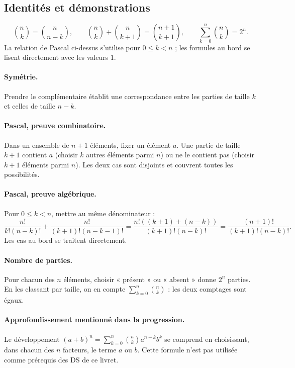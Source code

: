 \subsection{Identités et démonstrations}
\[\binom nk=\binom n{n-k},\qquad \binom nk+\binom n{k+1}=\binom{n+1}{k+1},\qquad\sum_{k=0}^n\binom nk=2^n.\]
La relation de Pascal ci-dessus s'utilise pour $0\le k<n$ ; les formules au bord se lisent directement avec les valeurs $1$.
\paragraph{Symétrie.} Prendre le complémentaire établit une correspondance entre les parties de taille $k$ et celles de taille $n-k$.
\paragraph{Pascal, preuve combinatoire.} Dans un ensemble de $n+1$ éléments, fixer un élément $a$. Une partie de taille $k+1$ contient $a$ (choisir $k$ autres éléments parmi $n$) ou ne le contient pas (choisir $k+1$ éléments parmi $n$). Les deux cas sont disjoints et couvrent toutes les possibilités.
\paragraph{Pascal, preuve algébrique.} Pour $0\le k<n$, mettre au même dénominateur :
\[\frac{n!}{k!(n-k)!}+\frac{n!}{(k+1)!(n-k-1)!}
=\frac{n!((k+1)+(n-k))}{(k+1)!(n-k)!}
=\frac{(n+1)!}{(k+1)!(n-k)!}.\]
Les cas au bord se traitent directement.
\paragraph{Nombre de parties.} Pour chacun des $n$ éléments, choisir « présent » ou « absent » donne $2^n$ parties. En les classant par taille, on en compte $\sum_{k=0}^n\binom nk$ : les deux comptages sont égaux.
\paragraph{Approfondissement mentionné dans la progression.} Le développement $(a+b)^n=\sum_{k=0}^n\binom nk a^{n-k}b^k$ se comprend en choisissant, dans chacun des $n$ facteurs, le terme $a$ ou $b$. Cette formule n'est pas utilisée comme prérequis des DS de ce livret.


\mxnewpage
